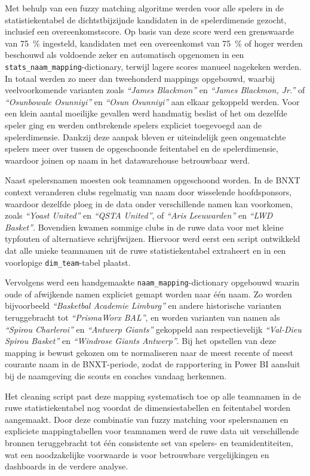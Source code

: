 Met behulp van een fuzzy matching algoritme werden voor alle spelers in de statistiekentabel de dichtstbijzijnde kandidaten in de spelerdimensie gezocht, inclusief een overeenkomstscore. Op basis van deze score werd een grenswaarde van 75~\% ingesteld, kandidaten met een overeenkomst van 75~\% of hoger werden beschouwd als voldoende zeker en automatisch opgenomen in een \texttt{stats\_naam\_mapping}-dictionary, terwijl lagere scores manueel nagekeken werden. In totaal werden zo meer dan tweehonderd mappings opgebouwd, waarbij veelvoorkomende varianten zoals \textit{``James Blackmon''} en \textit{``James Blackmon, Jr.''} of \textit{``Osunbowale Osunniyi''} en \textit{``Osun Osunniyi''} aan elkaar gekoppeld werden. Voor een klein aantal moeilijke gevallen werd handmatig beslist of het om dezelfde speler ging en werden ontbrekende spelers expliciet toegevoegd aan de spelerdimensie. Dankzij deze aanpak bleven er uiteindelijk geen ongematchte spelers meer over tussen de opgeschoonde feitentabel en de spelerdimensie, waardoor joinen op naam in het datawarehouse betrouwbaar werd.

Naast spelersnamen moesten ook teamnamen opgeschoond worden. In de BNXT context veranderen clubs regelmatig van naam door wisselende hoofdsponsors, waardoor dezelfde ploeg in de data onder verschillende namen kan voorkomen, zoals \textit{``Yoast United''} en \textit{``QSTA United''}, of \textit{``Aris Leeuwarden''} en \textit{``LWD Basket''}. Bovendien kwamen sommige clubs in de ruwe data voor met kleine typfouten of alternatieve schrijfwijzen. Hiervoor werd eerst een script ontwikkeld dat alle unieke teamnamen uit de ruwe statistiekentabel extraheert en in een voorlopige \texttt{dim\_team}-tabel plaatst.

Vervolgens werd een handgemaakte \texttt{naam\_mapping}-dictionary opgebouwd waarin oude of afwijkende namen expliciet gemapt worden naar één naam. Zo worden bijvoorbeeld \textit{``Basketbal Academie Limburg''} en andere historische varianten teruggebracht tot \textit{``PrismaWorx BAL''}, en worden varianten van namen als \textit{``Spirou Charleroi''} en \textit{``Antwerp Giants''} gekoppeld aan respectievelijk \textit{``Val-Dieu Spirou Basket''} en \textit{``Windrose Giants Antwerp''}. Bij het opstellen van deze mapping is bewust gekozen om te normaliseren naar de meest recente of meest courante naam in de BNXT-periode, zodat de rapportering in Power BI aansluit bij de naamgeving die scouts en coaches vandaag herkennen.

Het cleaning script past deze mapping systematisch toe op alle teamnamen in de ruwe statistiekentabel nog voordat de dimensiestabellen en feitentabel worden aangemaakt. Door deze combinatie van fuzzy matching voor spelersnamen en expliciete mappingtabellen voor teamnamen werd de ruwe data uit verschillende bronnen teruggebracht tot één consistente set van spelers- en teamidentiteiten, wat een noodzakelijke voorwaarde is voor betrouwbare vergelijkingen en dashboards in de verdere analyse.


